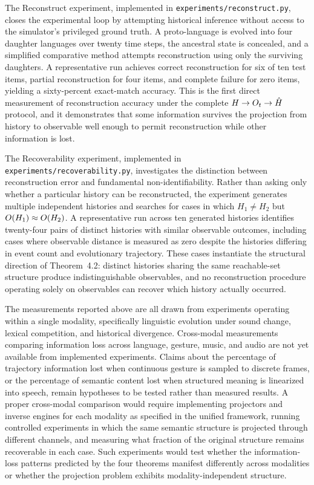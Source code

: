 The Reconstruct experiment, implemented in \texttt{experiments/reconstruct.py}, closes the experimental loop by attempting historical inference without access to the simulator's privileged ground truth. A proto-language is evolved into four daughter languages over twenty time steps, the ancestral state is concealed, and a simplified comparative method attempts reconstruction using only the surviving daughters. A representative run achieves correct reconstruction for six of ten test items, partial reconstruction for four items, and complete failure for zero items, yielding a sixty-percent exact-match accuracy. This is the first direct measurement of reconstruction accuracy under the complete $H \to O_t \to \hat{H}$ protocol, and it demonstrates that some information survives the projection from history to observable well enough to permit reconstruction while other information is lost.

The Recoverability experiment, implemented in \texttt{experiments/recoverability.py}, investigates the distinction between reconstruction error and fundamental non-identifiability. Rather than asking only whether a particular history can be reconstructed, the experiment generates multiple independent histories and searches for cases in which $H_1 \neq H_2$ but $O(H_1) \approx O(H_2)$. A representative run across ten generated histories identifies twenty-four pairs of distinct histories with similar observable outcomes, including cases where observable distance is measured as zero despite the histories differing in event count and evolutionary trajectory. These cases instantiate the structural direction of Theorem~4.2: distinct histories sharing the same reachable-set structure produce indistinguishable observables, and no reconstruction procedure operating solely on observables can recover which history actually occurred.

The measurements reported above are all drawn from experiments operating within a single modality, specifically linguistic evolution under sound change, lexical competition, and historical divergence. Cross-modal measurements comparing information loss across language, gesture, music, and audio are not yet available from implemented experiments. Claims about the percentage of trajectory information lost when continuous gesture is sampled to discrete frames, or the percentage of semantic content lost when structured meaning is linearized into speech, remain hypotheses to be tested rather than measured results. A proper cross-modal comparison would require implementing projectors and inverse engines for each modality as specified in the unified framework, running controlled experiments in which the same semantic structure is projected through different channels, and measuring what fraction of the original structure remains recoverable in each case. Such experiments would test whether the information-loss patterns predicted by the four theorems manifest differently across modalities or whether the projection problem exhibits modality-independent structure.

